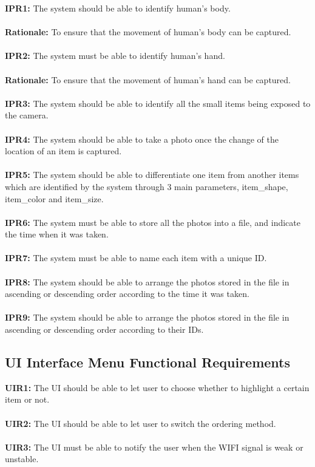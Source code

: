 \documentclass[12pt]{article}
\begin{document}
\textbf{IPR1:} The system should be able to identify human's body.\\\\
\textbf{Rationale:} To ensure that the movement of human’s body can be captured.\\\\
\textbf{IPR2:} The system must be able to identify human's hand.\\\\
\textbf{Rationale:} To ensure that the movement of human’s hand can be captured.\\\\
\textbf{IPR3:} The system should be able to identify all the small items being exposed to the camera.\\\\
\textbf{IPR4:} The system should be able to take a photo once the change of the location of an item is captured.\\\\
\textbf{IPR5:} The system should be able to differentiate one item from another items which are identified by the system through 3 main parameters, item\_shape, item\_color and item\_size.\\\\
\textbf{IPR6:} The system must be able to store all the photos into a file, and indicate the time when it was taken.\\\\
\textbf{IPR7:} The system must be able to name each item with a unique ID.\\\\
\textbf{IPR8:} The system should be able to arrange the photos stored in the file in ascending or descending order according to the time it was taken.\\\\
\textbf{IPR9:} The system should be able to arrange the photos stored in the file in ascending or descending order according to their IDs.

\subsection{UI Interface Menu Functional Requirements}
\textbf{UIR1:} The UI should be able to let user to choose whether to highlight a certain item or not.\\\\
\textbf{UIR2:} The UI should be able to let user to switch the ordering method.\\\\
\textbf{UIR3:} The UI must be able to notify the user when the WIFI signal is weak or unstable.\\\\
\end{document}
